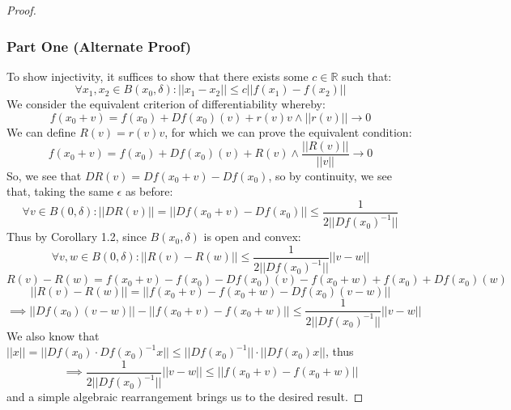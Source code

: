 \documentclass[10pt,letterpaper]{article} %
\begin{document}
\begin{proof}
\subsubsection*{Part One (Alternate Proof)}
To show injectivity, it suffices to show that there exists some $c \in \mathbb{R}$ such that:
\begin{equation*}
\forall x_1, x_2 \in B(x_0, \delta): ||x_1 - x_2|| \leqslant c||f(x_1) - f(x_2)||
\end{equation*}
We consider the equivalent criterion of differentiability whereby:
\begin{equation*}
f(x_0+v) = f(x_0) + Df(x_0)(v) + r(v)v \land ||r(v)|| \xrightarrow{} 0
\end{equation*}
We can define $R(v) = r(v)v$, for which we can prove the equivalent condition:
\begin{equation*}
f(x_0+v) = f(x_0) + Df(x_0)(v) + R(v) \land \frac{||R(v)||}{||v||} \xrightarrow{} 0
\end{equation*}
So, we see that $DR(v) = Df(x_0+v) - Df(x_0)$, so by continuity, we see that, taking the same $\epsilon$ as before:
\begin{equation*}
\forall v \in B(0, \delta): ||DR(v)|| = ||Df(x_0+v) - Df(x_0)|| \leqslant \frac{1}{2||Df(x_0)^{-1}||}
\end{equation*}
Thus by Corollary 1.2, since $B(x_0, \delta)$ is open and convex:
\begin{equation*}
\forall v, w \in B(0, \delta): ||R(v) - R(w)|| \leqslant \frac{1}{2||Df(x_0)^{-1}||}||v-w|| 
\end{equation*}
\begin{equation*}
R(v) - R(w) = f(x_0+v) - f(x_0) - Df(x_0)(v) - f(x_0+w) + f(x_0) + Df(x_0)(w)
\end{equation*}
\begin{equation*}
||R(v) - R(w)|| = ||f(x_0+v) - f(x_0+w) - Df(x_0)(v-w)||
\end{equation*}
\begin{equation*}
\implies ||Df(x_0)(v-w)|| -  ||f(x_0 + v) - f(x_0 + w)|| \leqslant \frac{1}{2||Df(x_0)^{-1}||}||v-w||
\end{equation*}
We also know that $||x|| = ||Df(x_0) \cdot Df(x_0)^{-1} x|| \leqslant ||Df(x_0)^{-1}|| \cdot ||Df(x_0)x||$, thus
\begin{equation*}
\implies \frac{1}{2||Df(x_0)^{-1}||}||v-w|| \leqslant ||f(x_0 + v) - f(x_0 + w)||
\end{equation*}
and a simple algebraic rearrangement brings us to the desired result.


\end{proof}
\end{document}
